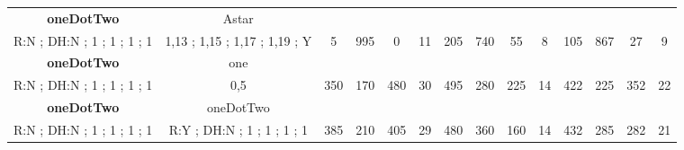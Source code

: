 \begin{table}[]
{\begin{tabular}{|c|c|c|c|c|c|c|c|c|c|c|c|c|c|}
\cellcolor{blue!15}\textbf{oneDotTwo} & Astar& {\color[HTML]{00009B} } & {\color[HTML]{9A0000} } & {\color[HTML]{009901} } &  & {\color[HTML]{00009B} } & {\color[HTML]{9A0000} } & {\color[HTML]{009901} } &  & {\color[HTML]{00009B} } & {\color[HTML]{9A0000} } & {\color[HTML]{009901} } &  \\ 
\cellcolor{ blue!15}R:N ; DH:N ; 1 ; 1 ; 1 ; 1 & 1,13 ; 1,15 ; 1,17 ; 1,19 ; Y & \multirow{-2}{*}{{\color[HTML]{00009B} 5}} & \multirow{-2}{*}{{\color[HTML]{9A0000} 995}} & \multirow{-2}{*}{{\color[HTML]{009901} 0}} & \multirow{-2}{*}{11} & \multirow{-2}{*}{{\color[HTML]{00009B} 205}} & \multirow{-2}{*}{{\color[HTML]{9A0000} 740}} & \multirow{-2}{*}{{\color[HTML]{009901} 55}} & \multirow{-2}{*}{8} & \multirow{-2}{*}{{\color[HTML]{00009B} 105}} & \multirow{-2}{*}{{\color[HTML]{9A0000} 867}} & \multirow{-2}{*}{{\color[HTML]{009901} 27}} & \multirow{-2}{*}{9} \\ \hline

\cellcolor{blue!15}\textbf{oneDotTwo} & one& {\color[HTML]{00009B} } & {\color[HTML]{9A0000} } & {\color[HTML]{009901} } &  & {\color[HTML]{00009B} } & {\color[HTML]{9A0000} } & {\color[HTML]{009901} } &  & {\color[HTML]{00009B} } & {\color[HTML]{9A0000} } & {\color[HTML]{009901} } &  \\ 
\cellcolor{ blue!15}R:N ; DH:N ; 1 ; 1 ; 1 ; 1 & 0,5 & \multirow{-2}{*}{{\color[HTML]{00009B} 350}} & \multirow{-2}{*}{{\color[HTML]{9A0000} 170}} & \multirow{-2}{*}{{\color[HTML]{009901} 480}} & \multirow{-2}{*}{30} & \multirow{-2}{*}{{\color[HTML]{00009B} 495}} & \multirow{-2}{*}{{\color[HTML]{9A0000} 280}} & \multirow{-2}{*}{{\color[HTML]{009901} 225}} & \multirow{-2}{*}{14} & \multirow{-2}{*}{{\color[HTML]{00009B} 422}} & \multirow{-2}{*}{{\color[HTML]{9A0000} 225}} & \multirow{-2}{*}{{\color[HTML]{009901} 352}} & \multirow{-2}{*}{22} \\ \hline

\cellcolor{blue!15}\textbf{oneDotTwo} & oneDotTwo& {\color[HTML]{00009B} } & {\color[HTML]{9A0000} } & {\color[HTML]{009901} } &  & {\color[HTML]{00009B} } & {\color[HTML]{9A0000} } & {\color[HTML]{009901} } &  & {\color[HTML]{00009B} } & {\color[HTML]{9A0000} } & {\color[HTML]{009901} } &  \\ 
\cellcolor{ blue!15}R:N ; DH:N ; 1 ; 1 ; 1 ; 1 & R:Y ; DH:N ; 1 ; 1 ; 1 ; 1 & \multirow{-2}{*}{{\color[HTML]{00009B} 385}} & \multirow{-2}{*}{{\color[HTML]{9A0000} 210}} & \multirow{-2}{*}{{\color[HTML]{009901} 405}} & \multirow{-2}{*}{29} & \multirow{-2}{*}{{\color[HTML]{00009B} 480}} & \multirow{-2}{*}{{\color[HTML]{9A0000} 360}} & \multirow{-2}{*}{{\color[HTML]{009901} 160}} & \multirow{-2}{*}{14} & \multirow{-2}{*}{{\color[HTML]{00009B} 432}} & \multirow{-2}{*}{{\color[HTML]{9A0000} 285}} & \multirow{-2}{*}{{\color[HTML]{009901} 282}} & \multirow{-2}{*}{21} \\ \hline


\end{tabular}}
\end{table}
